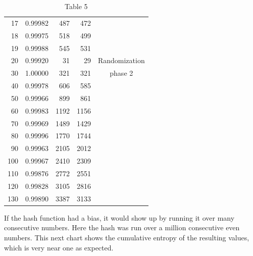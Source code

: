 \documentclass[preprint]{sigplanconf}
\begin{document}
\begin{table}
\begin{center}
\begin{tabular}{|r|r|r|r|c|}
        17            & 0.99982          & 487           & 472            &                \\
        18            & 0.99975          & 518           & 499            &                \\
        19            & 0.99988          & 545           & 531            &                \\
        \hline
        20            & 0.99920          & 31            & 29             & Randomization  \\
        30            & 1.00000          & 321           & 321            & phase 2        \\
        40            & 0.99978          & 606           & 585            &                \\
        50            & 0.99966          & 899           & 861            &                \\
        60            & 0.99983          & 1192          & 1156           &                \\
        70            & 0.99969          & 1489          & 1429           &                \\
        80            & 0.99996          & 1770          & 1744           &                \\
        90            & 0.99963          & 2105          & 2012           &                \\
        100           & 0.99967          & 2410          & 2309           &                \\
        110           & 0.99876          & 2772          & 2551           &                \\
        120           & 0.99828          & 3105          & 2816           &                \\
        130           & 0.99890          & 3387          & 3133           &                \\
        \hline
    \end{tabular}
    \caption{Table 5}
    \label{tab-5}
\end{center}
\end{table}

If the hash function had a bias, it would show up by running it over many consecutive numbers. Here the hash was run over a million consecutive even numbers. This next chart shows the cumulative entropy of the resulting values, which is very near one as expected.
\end{document}
